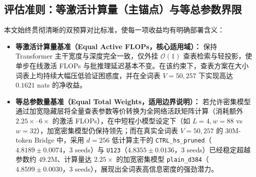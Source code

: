 \documentclass[10.5pt,a4paper]{ctexart}
\begin{document}
\begin{table}[htbp]
\centering
\caption{本文与代表性输入侧多粒度缩放工作 Over-Tokenized Transformer（Huang et al., ICML 2025）的逐项对齐（Delta Table）}
\label{tab:ot_delta}
\end{table}

\subsection{评估准则：等激活计算量（主锚点）与等总参数界限}
本文始终贯彻清晰的双预算对比标准，使每一项收益均有明确部署含义：
\begin{itemize}
    \item \textbf{等激活计算量基准（Equal Active FLOPs，核心适用域）：} 保持 Transformer 主干宽度与深度完全一致，仅外挂 $\mathcal{O}(1)$ 查表检索与轻投影，使单步在线激活 FLOPs 与批推理延迟基本不变。在该约束下，查表方案在大小词表上均持续大幅压低验证困惑度，并在全词表 $V=50{,}257$ 下实现高达 $0.1621$ nats 的净收益。
    \item \textbf{等总参数量基准（Equal Total Weights，适用边界说明）：} 若允许密集模型通过加宽隐藏层将全量查表参数等价转换为全网络活跃矩阵计算（消耗额外 $2.25\times\text{--}6\times$ 的激活 FLOPs），在中短程小模型设定下（如 $L=4, w=88$ vs $w=32$），加宽密集模型仍保持领先；而在真实全词表 $V=50{,}257$ 的 $30\text{M}$-token Bridge 中，采用 $d=256$ 低计算主干的 \texttt{CTRL\_hs\_pruned}（$4.8189 \pm 0.0074$，3 seeds）与 \texttt{U123}（$4.8355 \pm 0.0136$，3 seeds）已经稳定超越参数约 $49.2\text{M}$、计算量达 $2.25\times$ 的加宽密集模型 \texttt{plain\_d384}（$4.8599 \pm 0.0030$，3 seeds），展现出全词表高信息密度的强劲潜力。
\end{itemize}
\end{document}

